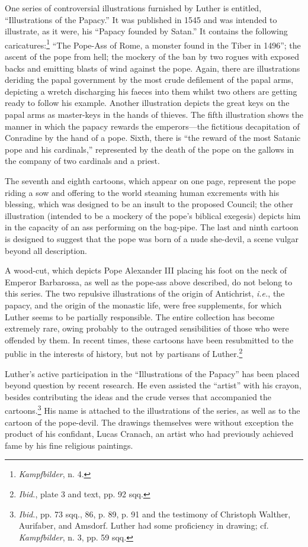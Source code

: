 One series of controversial illustrations furnished by Luther is entitled,
“Illustrations of the Papacy.” It was published in 1545 and
was intended to illustrate, as it were, his “Papacy founded by Satan.”
It contains the following caricatures:\footnote{\textit{Kampfbilder}, n. 4.}
“The Pope-Ass of Rome, a
monster found in the Tiber in 1496”; the ascent of the pope from
hell; the mockery of the ban by two rogues with exposed backs and
emitting blasts of wind against the pope. Again, there are illustrations
deriding the papal government by the most crude defilement of
the papal arms, depicting a wretch discharging his faeces into them
whilst two others are getting ready to follow his example. Another
illustration depicts the great keys on the papal arms as master-keys in
the hands of thieves. The fifth illustration shows the manner in which
the papacy rewards the emperors—the fictitious decapitation of Conradine
by the hand of a pope. Sixth, there is “the reward of the most
Satanic pope and his cardinals,” represented by the death of the
pope on the gallows in the company of two cardinals and a priest.

The seventh and eighth cartoons, which appear on one page, represent
the pope riding a sow and offering to the world steaming human excrements
with his blessing, which was designed to be an insult to the
proposed Council; the other illustration (intended to be a mockery
of the pope’s biblical exegesis) depicts him in the capacity of an ass
performing on the bag-pipe. The last and ninth cartoon is designed to
suggest that the pope was born of a nude she-devil, a scene vulgar
beyond all description.

A wood-cut, which depicts Pope Alexander III placing his foot on
the neck of Emperor Barbarossa, as well as the pope-ass above described,
do not belong to this series. The two repulsive illustrations of
the origin of Antichrist, \textit{i.e.}, the papacy, and the origin of the monastic
life, were free supplements, for which Luther seems to be partially responsible.
The entire collection has become extremely rare,
owing probably to the outraged sensibilities of those who were offended
by them. In recent times, these cartoons have been resubmitted to the
public in the interests of history, but not by partisans of Luther.\footnote{\textit{Ibid.}, plate 3 and text, pp. 92 sqq.}

Luther’s active participation in the “Illustrations of the Papacy”
has been placed beyond question by recent research. He even assisted
the “artist” with his crayon, besides contributing the ideas
and the crude verses that accompanied the cartoons.\footnote
{\textit{Ibid.}, pp. 73 sqq., 86, p. 89, p. 91 and the testimony of Christoph Walther, Aurifaber,
and Amsdorf. Luther had some proficiency in drawing; cf. \textit{Kampfbilder}, n. 3, pp. 59 sqq.}
His name is
attached to the illustrations of the series, as well as to the cartoon of
the pope-devil. The drawings themselves were without exception the
product of his confidant, Lucas Cranach, an artist who had previously
achieved fame by his fine religious paintings.

